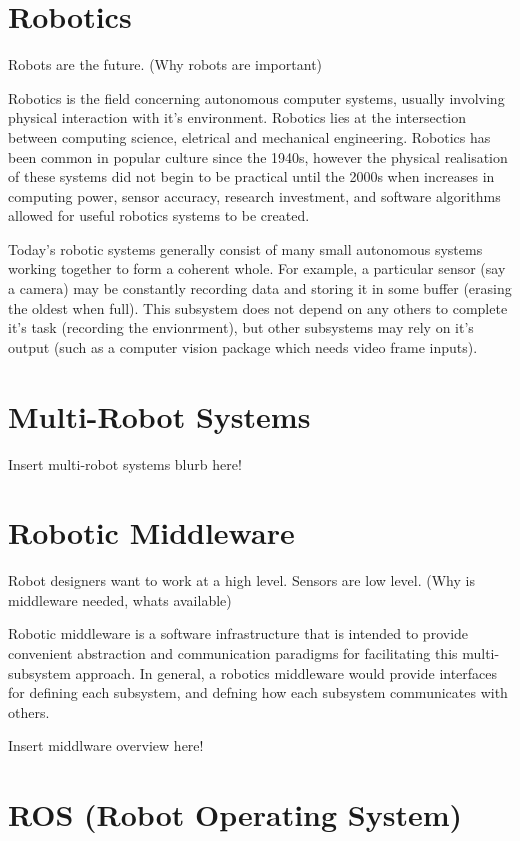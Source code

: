 \documentclass{l4proj}
\begin{document}
\section{Robotics}

Robots are the future. (Why robots are important)

Robotics is the field concerning autonomous computer systems, usually involving physical interaction with it's environment. Robotics lies at the intersection between computing science, eletrical and mechanical engineering. Robotics has been common in popular culture since the 1940s, however the physical realisation of these systems did not begin to be practical until the 2000s when increases in computing power, sensor accuracy, research investment, and software algorithms allowed for useful robotics systems to be created.

Today's robotic systems generally consist of many small autonomous systems working together to form a coherent whole. For example, a particular sensor (say a camera) may be constantly recording data and storing it in some buffer (erasing the oldest when full). This subsystem does not depend on any others to complete it's task (recording the envionrment), but other subsystems may rely on it's output (such as a computer vision package which needs video frame inputs).

\section{Multi-Robot Systems}

Insert multi-robot systems blurb here!

\section{Robotic Middleware}

Robot designers want to work at a high level. Sensors are low level. (Why is middleware needed, whats available)

Robotic middleware is a software infrastructure that is intended to provide convenient abstraction and communication paradigms for facilitating this multi-subsystem approach. In general, a robotics middleware would provide interfaces for defining each subsystem, and defning how each subsystem communicates with others.

Insert middlware overview here!

\section{ROS (Robot Operating System)}
\end{document}
